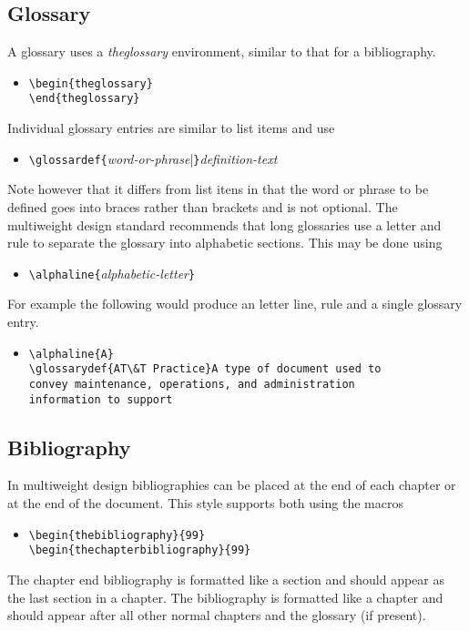\subsection{Glossary}
A glossary uses a {\it theglossary} environment, similar to that for a
bibliography.
\begin{itemize}
  \item[]
        \verb|\begin{theglossary}|\\
        \verb|\end{theglossary}|
\end{itemize}
Individual glossary entries are similar to list items and use
\begin{itemize}
  \item[]\verb|\glossardef{|{\it word-or-phrase}|\verb|}|{\it definition-text}
\end{itemize}
Note however that it differs from list itens in that the word or
phrase to be defined goes into braces rather than brackets and is not
optional.  The multiweight design standard recommends that long
glossaries use a letter and rule to separate the glossary into
alphabetic sections.  This may be done using 
\begin{itemize}
  \item[]\verb|\alphaline{|{\it alphabetic-letter}\verb|}|
\end{itemize}
For example the following would produce an letter line, rule and a
single glossary entry.
\begin{itemize}
  \item[]
        \verb|\alphaline{A}|\\
        \verb|\glossarydef{AT\&T Practice}A type of document used to|\\
        \verb|convey maintenance, operations, and administration|\\
        \verb|information to support|
\end{itemize}

\subsection{Bibliography}
In multiweight design bibliographies can be placed at the end of each
chapter or at the end of the document.  This style supports both using
the macros
\begin{itemize}
  \item[]
        \verb|\begin{thebibliography}{99}|\\
        \verb|\begin{thechapterbibliography}{99}|
\end{itemize}
The chapter end bibliography is formatted like a section and should
appear as the last section in a chapter.  The bibliography is
formatted like a chapter and should appear after all other normal
chapters and the glossary (if present).

